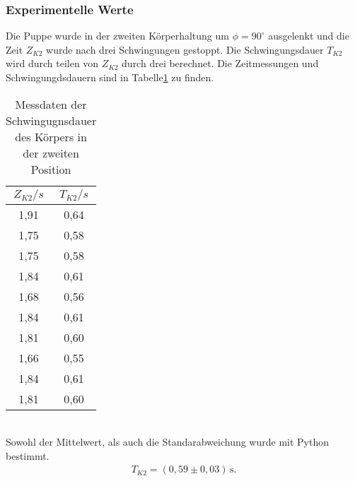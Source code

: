 \subsubsection{Experimentelle Werte}
Die Puppe wurde in der zweiten Körperhaltung um $\phi = 90^{\circ}$ ausgelenkt und die Zeit $Z_{K2}$
wurde nach drei Schwingungen gestoppt. Die Schwingungsdauer $T_{K2}$ wird durch teilen von $Z_{K2}$
durch drei berechnet. Die Zeitmessungen und Schwingungdsdauern sind in Tabelle\ref{tab:Koerper2} zu finden.
\begin{table}
  \centering
  \caption{Messdaten der Schwingugnsdauer des Körpers in der zweiten Position}
  \label{tab:Koerper2}
  \begin{tabular}{c c}
    \toprule
    $Z_{K2}/s$ & $T_{K2}/s$ \\
    \midrule
    1,91 & 0,64 \\
    1,75 & 0,58 \\
    1,75 & 0,58 \\
    1,84 & 0,61 \\
    1,68 & 0,56 \\
    1,84 & 0,61 \\
    1,81 & 0,60 \\
    1,66 & 0,55 \\
    1,84 & 0,61 \\
    1,81 & 0,60 \\
    \bottomrule
  \end{tabular}
\end{table}
\\
Sowohl der Mittelwert, als auch die Standarabweichung wurde mit Python bestimmt.
\begin{align*}
  T_{K2} = (0{,}59 \pm 0{,}03)\, \mathrm{s} .
\end{align*}

